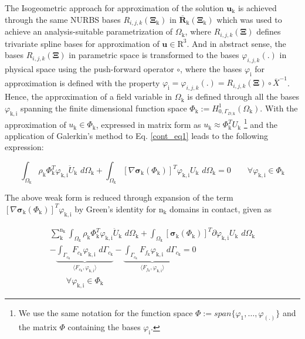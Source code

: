 \iffalse
The Isogeometric approach for approximation of the solution $\bm{u}_\mathrm{k}$ is achieved through the same NURBS bases $R_{i,j,k}(\mathbf{\Xi}_\mathrm{k})$ in $\mathbf{\overline{R}_\mathrm{k}(\Xi_\mathrm{k})}$ which was used to achieve an analysis-suitable parametrization of $\Omega_{\mathrm{k}}$, where $R_{i,j,k}(\mathbf{\Xi})$ defines trivariate spline bases for approximation of $\bm{u} \in \mathrm{R}^3$. 
And in abstract sense, the bases $R_{i,j,k}(\mathbf{\Xi})$ in parametric space is transformed to the bases $\varphi_{i,j,k}(.)$ in physical space using the push-forward operator $\circ$, where the bases $\varphi_{\mathrm{i}}$ for approximation is defined with the property $\varphi_\mathrm{i}=\varphi_{i,j,k}(.)=R_{i,j,k}(\mathbf{\Xi}) \circ \overline{X}^{-1}$.
Hence, the approximation of a field variable in $\Omega_\mathrm{k}$ is defined through all the bases $\varphi_{\mathrm{k},\mathrm{i}}$ spanning the finite dimensional function space $\Phi_\mathrm{k} := H_{0,\Gamma_{D,\mathrm{k}}}^1(\Omega_{\mathrm{k}})$. With the approximation of $u_{\mathrm{k}} \in \Phi_\mathrm{k}$, expressed in matrix form as $u_\mathrm{k} \approx \Phi_\mathrm{k}^T U_\mathrm{k}$ \footnote{We use the same notation for the function space $\Phi:= span\{\varphi_1,\hdots,\varphi_{(.)}\}$ and the matrix $\Phi$ containing the bases $\varphi_{\mathrm{i}}$.} and the application of Galerkin's method to Eq. \eqref{cont_eq1} leads to the following expression:

\begin{equation}
   \int_{\Omega_\mathrm{k}}\rho_\mathrm{k} \Phi^T_\mathrm{k} \varphi_{\mathrm{k},\mathrm{i}} \ddot{U}_\mathrm{k}\,\, d\Omega_\mathrm{k}+\int_{\Omega_\mathrm{k}}[\nabla\bm{\sigma}_\mathrm{k}(\Phi_\mathrm{k})]^T\varphi_{\mathrm{k},\mathrm{i}} U_\mathrm{k} \,\, d\Omega_\mathrm{k}=0 \qquad \forall \varphi_{\mathrm{k},\mathrm{i}} \in \Phi_\mathrm{k} \label{cont2}
\end{equation}

The above weak form is reduced through expansion of the term $[\nabla\bm{\sigma}_\mathrm{k}(\Phi_\mathrm{k})]^T \varphi_{\mathrm{k},\mathrm{i}}$ by Green's identity  for $\mathrm{n}_{\mathrm{\mathrm{k}}}$ domains in contact, given as

\begin{multline}
\sum_\mathrm{k}^{\mathrm{n}_{\mathrm{\mathrm{k}}}}  \int_{\Omega_\mathrm{k}}\rho_\mathrm{k} \Phi^T_\mathrm{k} \varphi_{\mathrm{k},\mathrm{i}} \ddot{U}_\mathrm{k}\,\, d\Omega_\mathrm{k}+\int_{\Omega_\mathrm{k}}[\bm{\sigma}_\mathrm{k}(\Phi_\mathrm{k})]^T \partial{\varphi}_{\mathrm{k},\mathrm{i}} U_\mathrm{k} \,\,d\Omega_\mathrm{k}\\
-\underbrace{\int_{\Gamma_{c_\mathrm{k}}}F_{c_\mathrm{k}}\varphi_{\mathrm{k},\mathrm{i}}\,\,d\Gamma_{c_\mathrm{k}}}_{\langle F_{c_\mathrm{k}},\varphi_{\mathrm{k},\mathrm{i}} \rangle}- \underbrace{\int_{\Gamma_{c_\mathrm{k}}}F_{f_\mathrm{k}}\varphi_{\mathrm{k},\mathrm{i}}\,\,d\Gamma_{c_\mathrm{k}}}_{\langle F_{f_\mathrm{k}},\varphi_{\mathrm{k},\mathrm{i}} \rangle} =0 \\
\qquad \forall \varphi_{\mathrm{k},\mathrm{i}} \in \Phi_\mathrm{k} \label{cont3}
\end{multline}

